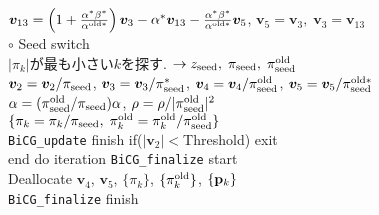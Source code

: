 \documentclass[12pt,titlepage]{jarticle}
\renewenvironment{leftbar}{%
  \def\FrameCommand{\vrule width 1pt \hspace{0pt}}%
  \MakeFramed {\advance\hsize-\width \FrameRestore}}%
 {\endMakeFramed}
\begin{document}
\begin{leftbar}
  \\\hspace{1.0cm}
  ${\boldsymbol v}_{1 3} = \left( 1 + \frac{\alpha^* \beta^*}{\alpha^{{\rm old} *}} \right) {\boldsymbol v}_3
  - \alpha^* {\boldsymbol v}_{1 3} - \frac{\alpha^* \beta^*}{\alpha^{{\rm old} *}} {\boldsymbol v}_5$, 
  ${\boldsymbol v}_5 = {\boldsymbol v}_3,\; 
  {\boldsymbol v}_3 = {\boldsymbol v}_{1 3}$
  \\\hspace{1.0cm}
  $\circ$ Seed switch
  \\\hspace{1.0cm}
  $|\pi_k|$が最も小さい$k$を探す. 
  $\rightarrow z_{\rm seed},\; \pi_{\rm seed},\; \pi_{\rm seed}^{\rm old} $
  \\\hspace{1.0cm}
  ${\boldsymbol v}_2 = {\boldsymbol v}_2 / \pi_{\rm seed}$,
  ${\boldsymbol v}_3 = {\boldsymbol v}_3 / \pi_{\rm seed}^{*}$, 
  ${\boldsymbol v}_4 = {\boldsymbol v}_4 / \pi_{\rm seed}^{\rm old}$,
  ${\boldsymbol v}_5 = {\boldsymbol v}_5 / \pi_{\rm seed}^{\rm old *}$
  \\\hspace{1.0cm}
  $\alpha = (\pi_{\rm seed}^{\rm old} / \pi_{\rm seed}) \alpha$,
  $\rho = \rho / |\pi_{\rm seed}^{\rm old}|^2$
  \\\hspace{1.0cm}
  $\{\pi_k = \pi_k / \pi_{\rm seed},\; \pi_k^{\rm old} = \pi_k^{\rm old} / \pi_{\rm seed}^{\rm old}\}$
  \\\hspace{0.5cm}
\verb|BiCG_update| finish
\end{leftbar}
\vspace{-1em}
\noindent
\hspace{0.5cm}
if($|{\boldsymbol v}_2| < $Threshold) exit
\\
end do iteration
\vspace{-1em}
\begin{leftbar}
\noindent
\verb|BiCG_finalize| start
\\ \hspace{0.5cm}
Deallocate ${\boldsymbol v}_4$, ${\boldsymbol v}_5$, $\{\pi_k\}$, $\{\pi_k^{\rm old}\}$, $\{{\bf p}_k\}$
\\
\verb|BiCG_finalize| finish
\end{leftbar}
\end{document}
